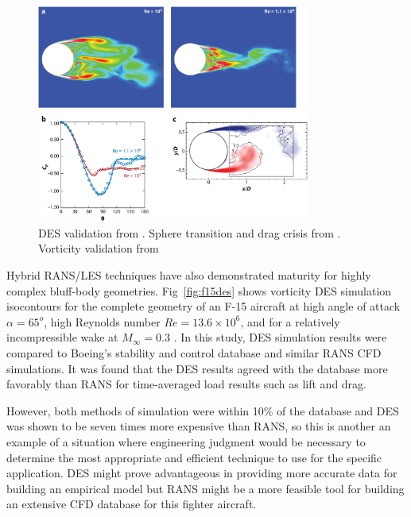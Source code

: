 \documentclass[journal]{new-aiaa}
\begin{document}
\begin{figure}[H]
\begin{center}
\includegraphics[width=0.8\textwidth]{Images/logan/spalart2009detachededdy_SphereSeparation.jpeg}
\caption{ DES validation from \cite{spalart2009detachededdy}. Sphere transition and drag crisis from \cite{squires2004detachededdy}.  Vorticity validation from \cite{mockett2008demonstration} }
\label{fig:desspherevalidation}
\end{center}
\end{figure}








Hybrid RANS/LES techniques have also demonstrated maturity for highly complex bluff-body geometries. Fig~\ref{fig:f15des} shows vorticity DES simulation isocontours for the complete geometry of an F-15 aircraft at high angle of attack $\alpha=65^o$, high Reynolds number $Re=13.6\times10^6$, and for a relatively incompressible wake at $M_{\infty}=0.3$ \cite{forsythe2004detachededdy}. In this study, DES simulation results were compared to Boeing’s stability and control database and similar RANS CFD simulations. It was found that the DES results agreed with the database more favorably than RANS for time-averaged load results such as lift and drag.

However, both methods of simulation were within 10\% of the database and DES was shown to be seven times more expensive than RANS, so this is another an example of a situation where engineering judgment would be necessary to determine the most appropriate and efficient technique to use for the specific application. DES might prove advantageous in providing more accurate data for building an empirical model but RANS might be a more feasible tool for building an extensive CFD database for this fighter aircraft.
\end{document}

